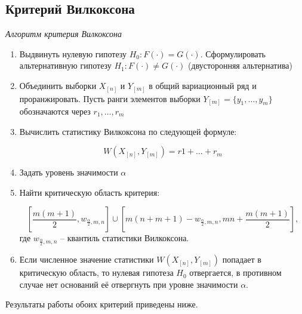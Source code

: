 \subsection{Критерий Вилкоксона}

\textit{Алгоритм критерия Вилкоксона}

\begin{enumerate}
	\item Выдвинуть нулевую гипотезу $H_0: F(\cdot) = G(\cdot)$. Сформулировать альтернативную гипотезу $H_1: F(\cdot) \ne G(\cdot)$ (двусторонняя альтернатива)
	\item Объединить выборки $X_{[n]}$ и $Y_{[m]}$ в общий вариационный ряд и проранжировать. Пусть ранги элементов выборки $Y_{[m]} = \{y_1, \ldots, y_m\}$ обозначаются через $r_1, \ldots, r_m$
	\item Вычислить статистику Вилкоксона по следующей формуле:
	
	\begin{equation}
		W(X_{[n]}, Y_{[m]}) = r1 + \ldots + r_m
	\end{equation}

	\item Задать уровень значимости $\alpha$
	\item Найти критическую область критерия:
	
	\begin{equation}
		\left[\frac{m(m + 1)}{2}, w_{\frac{\alpha}{2},m,n} \right] \cup \left[m(n + m + 1) - w_{\frac{\alpha}{2},m,n}, mn + \frac{m(m + 1)}{2} \right],
	\end{equation}
	где $w_{\frac{\alpha}{2},m,n}$ -- квантиль статистики Вилкоксона.

	\item Если численное значение статистики $W(X_{[n]}, Y_{[m]})$ попадает в критическую область, то нулевая гипотеза $H_0$ отвергается, в противном случае нет оснований её отвергнуть при уровне значимости $\alpha$.
\end{enumerate}

Результаты работы обоих критерий приведены ниже.

